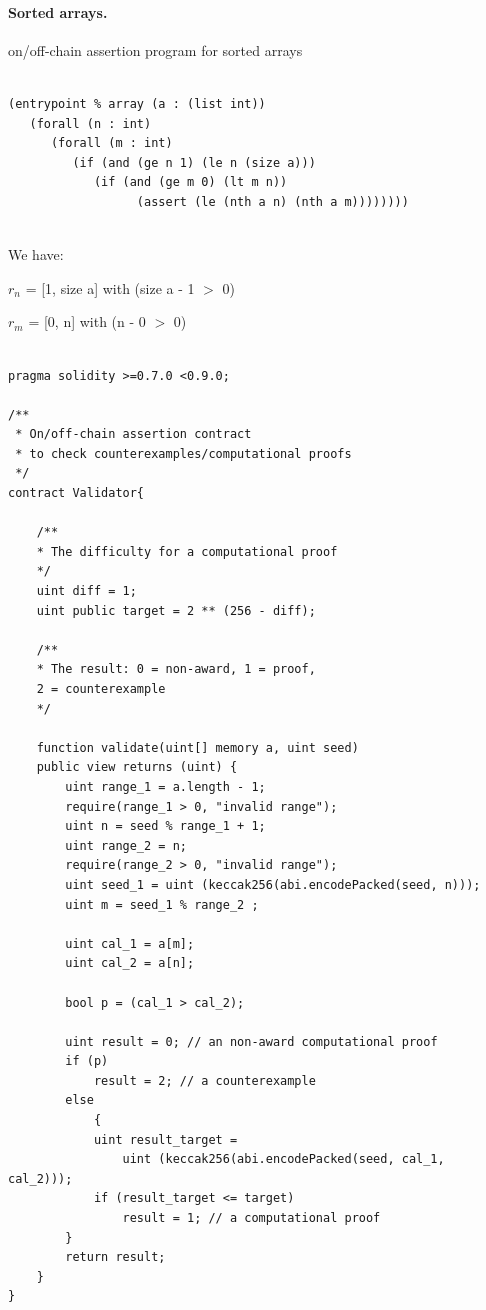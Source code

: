 \documentclass[runningheads]{llncs}
\begin{document}
\paragraph{Sorted arrays.}{ on/off-chain assertion program for sorted arrays}

\begin{lstlisting}[numbers=none]

(entrypoint % array (a : (list int))
   (forall (n : int)
      (forall (m : int)
         (if (and (ge n 1) (le n (size a)))
            (if (and (ge m 0) (lt m n))
                  (assert (le (nth a n) (nth a m))))))))
                  
\end{lstlisting}

\noindent We have:

$r_{n}$ = [1, size a] with (size a - 1 $>$ 0)

$r_{m}$ = [0, n] with (n - 0 $>$ 0)

\begin{lstlisting}[numbers=none]

pragma solidity >=0.7.0 <0.9.0;

/**
 * On/off-chain assertion contract 
 * to check counterexamples/computational proofs
 */
contract Validator{

    /**
    * The difficulty for a computational proof
    */
    uint diff = 1;
    uint public target = 2 ** (256 - diff); 

    /**
    * The result: 0 = non-award, 1 = proof, 
    2 = counterexample
    */

    function validate(uint[] memory a, uint seed)
    public view returns (uint) {
        uint range_1 = a.length - 1; 
        require(range_1 > 0, "invalid range");
        uint n = seed % range_1 + 1;
        uint range_2 = n;
        require(range_2 > 0, "invalid range");
        uint seed_1 = uint (keccak256(abi.encodePacked(seed, n)));
        uint m = seed_1 % range_2 ;
        
        uint cal_1 = a[m];
        uint cal_2 = a[n];
        
        bool p = (cal_1 > cal_2);

        uint result = 0; // an non-award computational proof 
        if (p)  
            result = 2; // a counterexample
        else 
            {
            uint result_target = 
                uint (keccak256(abi.encodePacked(seed, cal_1, cal_2)));
            if (result_target <= target) 
                result = 1; // a computational proof      
        }             
        return result;           
    }
}

\end{lstlisting}
\end{document}

